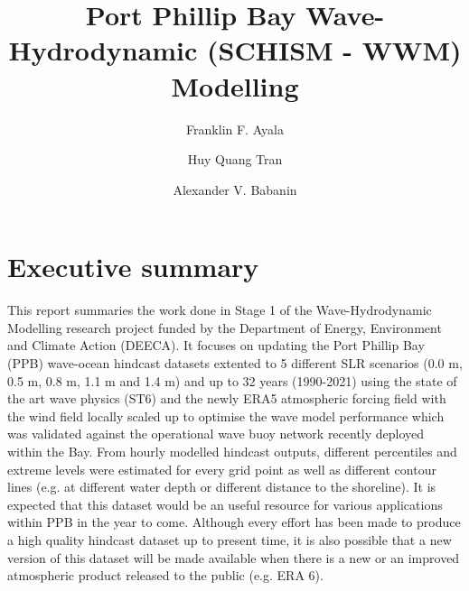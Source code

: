 \documentclass[12pt]{article}
\title{\vspace{-2cm} \Large Port Phillip Bay Wave-Hydrodynamic (SCHISM - WWM) Modelling}
\author[1]{\normalsize Franklin F. Ayala}
\author[1]{Huy Quang Tran}
\author[1,*]{Alexander V. Babanin}
\affil[1]{Faculty of Engineering and Information Technology (FEIT), University of Melbourne, Melbourne, VIC 3010, Australia; \href{mailto:a.babanin@unimelb.edu.au}{a.babanin@unimelb.edu.au}}
\begin{document}
\maketitle

\section*{Executive summary}
This report summaries  the work done in Stage 1 of the Wave-Hydrodynamic Modelling research project funded by the Department of Energy, Environment and Climate Action (DEECA). It focuses on updating the Port Phillip Bay  (PPB) wave-ocean hindcast datasets extented to 5 different SLR scenarios (0.0 m, 0.5 m, 0.8 m, 1.1 m and 1.4 m) and up to 32 years (1990-2021) using the state of the art wave physics (ST6) and the newly ERA5 atmospheric forcing field with the wind field locally scaled up to optimise the wave model performance which was validated against the operational wave buoy network recently deployed within the Bay.  From hourly modelled hindcast outputs, different percentiles and extreme levels were estimated for every grid point as well as  different contour lines (e.g. at different water depth or different distance to the shoreline). It is expected that this  dataset would be an useful resource for various applications within PPB in the year to come.  Although every effort has been made to produce a high quality hindcast dataset up to present time, it is also possible that a new version of this dataset will be made available when there is a new or an improved atmospheric product released to the public (e.g. ERA 6).\\


\end{document}
